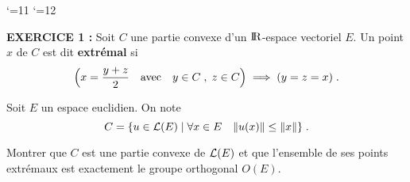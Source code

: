 \documentclass{article}
\begin{document}
\def\boxit#1#2{\setbox1=\hbox{\kern#1{#2}\kern#1}%
\dimen1=\ht1 \advance\dimen1 by #1 \dimen2=\dp1 \advance\dimen2 by #1
\setbox1=\hbox{\vrule height\dimen1 depth\dimen2\box1\vrule}%
\setbox1=\vbox{\hrule\box1\hrule}%
\advance\dimen1 by .4pt \ht1=\dimen1
\advance\dimen2 by .4pt \dp1=\dimen2 \box1\relax}


\catcode`\@=11
\def\system#1{\left\{\null\,\vcenter{\openup1\jot\m@th
\ialign{\strut\hfil$##$&$##$\hfil&&\enspace$##$\enspace&
\hfil$##$&$##$\hfil\crcr#1\crcr}}\right.}
\catcode`\@=12
\pagestyle{empty}
\def\lap#1{{\cal L}[#1]}
\def\DP#1#2{{\partial#1\s\partial#2}}
\def\cala{{\cal A}}
\def\fhat{\widehat{f}}
\let\wh=\widehat
\def\ftilde{\tilde{f}}











\def\lap#1{{\cal L}[#1]}
\def\DP#1#2{{\partial#1\s\partial#2}}



\overfullrule=0mm


\msk
{}
\bsk

{\bf EXERCICE 1 :}\msk
Soit $C$ une partie convexe d'un ${\rm I\kern-0.6mm R}$-espace vectoriel $E$. Un point $x$ de $C$ est dit {\bf extr\'emal} si\vv
$$\Big(x={y+z\over2}\quad{\rm avec}\quad y\in C\;,\;z\in C\Big)\;\Longrightarrow\;(y=z=x)\;.$$
\par
Soit $E$ un espace euclidien. On note\vv
$$C=\{u\in{\cal L}(E)\;|\;\forall x\in E\quad\|u(x)\|\leq\|x\|\}\;.$$\par
Montrer que $C$ est une partie convexe de ${\cal L}(E)$ et que l'ensemble de ses points extr\'emaux est exactement le groupe orthogonal $O(E)$.
\end{document}
